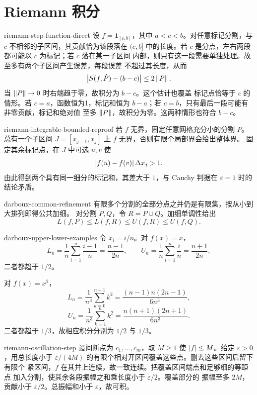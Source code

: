 \chapter{Riemann 积分}
\label{chap:riemann-integral-solutions}

\begin{solution}{riemann-step-function-direct}
设 \(f=\mathbf1_{[c,b]}\)，其中 \(a<c<b\)。对任意标记分割，与
\(c\) 不相邻的子区间，其贡献恰为该段落在 \((c,b]\) 中的长度。若
\(c\) 是分点，左右两段都可能以 \(c\) 为标记；若 \(c\) 落在某一子区间
内部，则只有这一段需要单独处理。故至多有两个子区间产生误差，每段误差
不超过其长度，从而
\[
 \left|S(f,\dot P)-(b-c)\right|\le2\left\lVert P\right\rVert.
\]
当 \(\left\lVert P\right\rVert\to0\) 时右端趋于零，故积分为 \(b-c\)。这个估计也覆盖
标记点恰等于 \(c\) 的情形。若 \(c=a\)，函数恒为1，标记和恒为
\(b-a\)；若 \(c=b\)，只有最后一段可能有非零贡献，标记和绝对值
至多 \(\left\lVert P\right\rVert\)，故积分为零。这两种情形也符合 \(b-c\)。
\end{solution}

\begin{solution}{riemann-integrable-bounded-reproof}
若 \(f\) 无界，固定任意网格充分小的分割 \(P\)。总有一个子区间
\(J=[x_{j-1},x_j]\) 上 \(f\) 无界，否则有限个局部界会给出整体界。
固定其余标记点，在 \(J\) 中可选 \(u,v\) 使
\[
 \left|f(u)-f(v)\right|\Delta x_j>1.
\]
由此得到两个具有同一细分的标记和，其差大于 \(1\)，与 Cauchy 判据在
\(\varepsilon=1\) 时的结论矛盾。
\end{solution}

\begin{solution}{darboux-common-refinement}
有限多个分割的全部分点之并仍是有限集，按从小到大排列即得公共加细。
对分割 \(P,Q\)，令 \(R=P\cup Q\)。加细单调性给出
\[
 L(f,P)\le L(f,R)\le U(f,R)\le U(f,Q).
\]
\end{solution}

\begin{solution}{darboux-upper-lower-examples}
令 \(x_i=i/n\)。对 \(f(x)=x\)，
\[
 L_n=\frac1n\sum_{i=1}^n\frac{i-1}{n}
 =\frac{n-1}{2n},\qquad
 U_n=\frac1n\sum_{i=1}^n\frac{i}{n}
 =\frac{n+1}{2n},
\]
二者都趋于 \(1/2\)。

对 \(f(x)=x^2\)，
\[
 L_n=\frac1{n^3}\sum_{k=0}^{n-1}k^2
 =\frac{(n-1)n(2n-1)}{6n^3},
\]
\[
 U_n=\frac1{n^3}\sum_{k=1}^{n}k^2
 =\frac{n(n+1)(2n+1)}{6n^3}.
\]
二者都趋于 \(1/3\)，故相应积分分别为 \(1/2\) 与 \(1/3\)。
\end{solution}

\begin{solution}{riemann-oscillation-step}
设间断点为 \(c_1,\ldots,c_m\)，取 \(M\ge1\) 使 \(\left|f\right|\le M\)。给定
\(\varepsilon>0\)，用总长度小于
\(\varepsilon/(4M)\) 的有限个相对开区间覆盖这些点。删去这些区间后留下有限个
紧区间，\(f\) 在其并上连续，故一致连续。把覆盖区间端点和足够细的等距点
加入分割，使其余各段振幅之和乘长度小于 \(\varepsilon/2\)。覆盖部分的
振幅至多 \(2M\)，贡献小于 \(\varepsilon/2\)。总振幅和小于
\(\varepsilon\)，故可积。
\end{solution}


